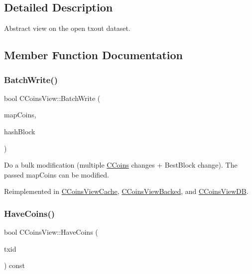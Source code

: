 \subsection{Detailed Description}
Abstract view on the open txout dataset. 

\subsection{Member Function Documentation}
\mbox{\label{class_c_coins_view_ad7dc37396ca4fac7014cea06fec7178e}} 
\subsubsection{\texorpdfstring{Batch\+Write()}{BatchWrite()}}
{\footnotesize\ttfamily bool C\+Coins\+View\+::\+Batch\+Write (\begin{DoxyParamCaption}\item[{C\+Coins\+Map \&}]{map\+Coins,  }\item[{const \mbox{\hyperlink{classuint256}{uint256}} \&}]{hash\+Block }\end{DoxyParamCaption})\hspace{0.3cm}{\ttfamily [virtual]}}

Do a bulk modification (multiple \mbox{\hyperlink{class_c_coins}{C\+Coins}} changes + Best\+Block change). The passed map\+Coins can be modified. 

Reimplemented in \mbox{\hyperlink{class_c_coins_view_cache_a561bb7c6c97701b12c48fbbb563d0a91}{C\+Coins\+View\+Cache}}, \mbox{\hyperlink{class_c_coins_view_backed_ace15da3934c9d7a9cb9c7a787f92f764}{C\+Coins\+View\+Backed}}, and \mbox{\hyperlink{class_c_coins_view_d_b_a33f98ec9323ce48e1704327bc8a2a002}{C\+Coins\+View\+DB}}.

\mbox{\label{class_c_coins_view_ade3a65fc3f1b02baf7bebce630e4eba3}} 
\subsubsection{\texorpdfstring{Have\+Coins()}{HaveCoins()}}
{\footnotesize\ttfamily bool C\+Coins\+View\+::\+Have\+Coins (\begin{DoxyParamCaption}\item[{const \mbox{\hyperlink{classuint256}{uint256}} \&}]{txid }\end{DoxyParamCaption}) const\hspace{0.3cm}{\ttfamily [virtual]}}

